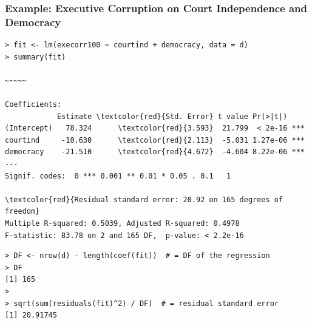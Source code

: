\documentclass[xcolor=svgnames,9pt,english,aspectratio=169,t]{beamer}
\begin{document}

\begin{frame}[fragile]
\frametitle{Example: Executive Corruption on Court Independence and Democracy}

\begin{Verbatim}[fontsize=\footnotesize, frame=single, label=R Code, commandchars=\\\{\}]
> fit <- lm(execorr100 ~ courtind + democracy, data = d)
> summary(fit)

~~~~~

Coefficients:
            Estimate \textcolor{red}{Std. Error} t value Pr(>|t|)
(Intercept)   78.324      \textcolor{red}{3.593}  21.799  < 2e-16 ***
courtind     -10.630      \textcolor{red}{2.113}  -5.031 1.27e-06 ***
democracy    -21.510      \textcolor{red}{4.672}  -4.604 8.22e-06 ***
---
Signif. codes:  0 *** 0.001 ** 0.01 * 0.05 . 0.1   1

\textcolor{red}{Residual standard error: 20.92 on 165 degrees of freedom}
Multiple R-squared: 0.5039,	Adjusted R-squared: 0.4978
F-statistic: 83.78 on 2 and 165 DF,  p-value: < 2.2e-16
\end{Verbatim}
\pause
\medskip
\begin{Verbatim}[fontsize=\footnotesize, frame=single, label=R Code, commandchars=\\\{\}]
> DF <- nrow(d) - length(coef(fit))  # = DF of the regression
> DF
[1] 165
>
> sqrt(sum(residuals(fit)^2) / DF)  # = residual standard error
[1] 20.91745
\end{Verbatim}

\end{frame}
\end{document}
